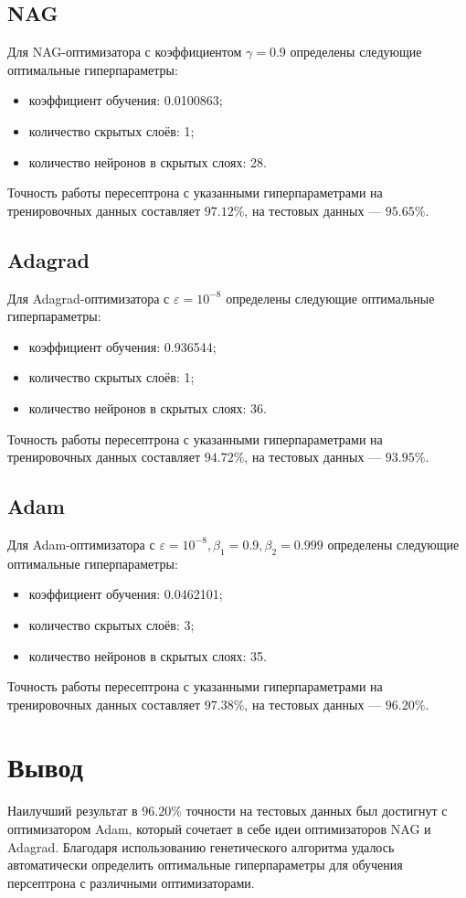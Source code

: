 \documentclass[a4paper, 14pt]{extarticle}
\begin{document}
\subsection{NAG}

Для NAG-оптимизатора с коэффициентом $\gamma = 0.9$ определены следующие оптимальные гиперпараметры:
\begin{itemize}
  \item коэффициент обучения: 0.0100863;
  \item количество скрытых слоёв: 1;
  \item количество нейронов в скрытых слоях: 28.
\end{itemize}
Точность работы пересептрона с указанными гиперпараметрами на тренировочных данных составляет $97.12\%$, на тестовых данных --- $95.65\%$.

\subsection{Adagrad}

Для Adagrad-оптимизатора с $\varepsilon = 10^{-8}$ определены следующие оптимальные гиперпараметры:
\begin{itemize}
  \item коэффициент обучения: 0.936544;
  \item количество скрытых слоёв: 1;
  \item количество нейронов в скрытых слоях: 36.
\end{itemize}
Точность работы пересептрона с указанными гиперпараметрами на тренировочных данных составляет $94.72\%$, на тестовых данных --- $93.95\%$.

\subsection{Adam}

Для Adam-оптимизатора с $\varepsilon = 10^{-8}, \beta_1 = 0.9, \beta_2 = 0.999$ определены следующие оптимальные гиперпараметры:
\begin{itemize}
  \item коэффициент обучения: 0.0462101;
  \item количество скрытых слоёв: 3;
  \item количество нейронов в скрытых слоях: 35.
\end{itemize}
Точность работы пересептрона с указанными гиперпараметрами на тренировочных данных составляет $97.38\%$, на тестовых данных --- $96.20\%$.

\section{Вывод}

Наилучший результат в $96.20\%$ точности на тестовых данных был достигнут с оптимизатором Adam, который сочетает в себе идеи оптимизаторов
NAG и Adagrad. Благодаря использованию генетического алгоритма удалось автоматически определить оптимальные гиперпараметры для обучения
персептрона с различными оптимизаторами.
\end{document}
